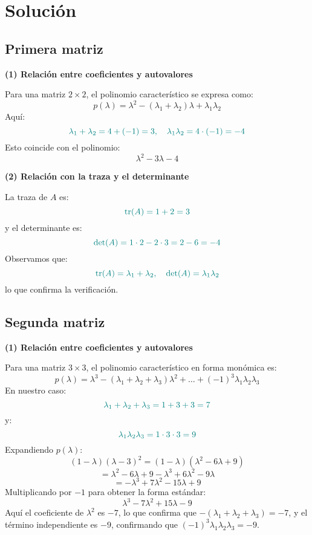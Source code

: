 \documentclass{article}
\begin{document}
\newpage
\section*{Solución}

\subsection*{Primera matriz}

\textbf{(1) Relación entre coeficientes y autovalores}

Para una matriz \(2\times2\), el polinomio característico se expresa como:
\[
p(\lambda) = \lambda^2 - (\lambda_1+\lambda_2)\lambda + \lambda_1\lambda_2
\]
Aquí:
\[
\color{teal}
\lambda_1 + \lambda_2 = 4 + (-1) = 3,
\quad
\lambda_1 \lambda_2 = 4\cdot(-1) = -4
\]
Esto coincide con el polinomio:
\[
\lambda^2 - 3\lambda - 4
\]

\bigskip

\textbf{(2) Relación con la traza y el determinante}

La traza de \(A\) es:
\[
\color{teal}
\text{tr}(A) = 1 + 2 = 3
\]
y el determinante es:
\[
\color{teal}
\det(A) = 1\cdot2 - 2\cdot3 = 2 - 6 = -4
\]
Observamos que:
\[
\color{teal}
\text{tr}(A) = \lambda_1 + \lambda_2,
\quad
\det(A) = \lambda_1 \lambda_2
\]
lo que confirma la verificación.

\subsection*{Segunda matriz}

\textbf{(1) Relación entre coeficientes y autovalores}

Para una matriz \(3\times3\), el polinomio característico en forma monómica es:
\[
p(\lambda) = \lambda^3 - (\lambda_1+\lambda_2+\lambda_3)\lambda^2 + \dots + (-1)^3\lambda_1\lambda_2\lambda_3
\]
En nuestro caso:
\[
\color{teal}
\lambda_1 + \lambda_2 + \lambda_3 = 1 + 3 + 3 = 7
\]
y:
\[
\color{teal}
\lambda_1 \lambda_2 \lambda_3 = 1\cdot3\cdot3 = 9
\]
Expandiendo \(p(\lambda)\):
\[
(1-\lambda)(\lambda-3)^2 = (1-\lambda)(\lambda^2-6\lambda+9)
\]
\[
= \lambda^2-6\lambda+9 - \lambda^3+6\lambda^2-9\lambda
\]
\[
= -\lambda^3+7\lambda^2-15\lambda+9
\]
Multiplicando por \(-1\) para obtener la forma estándar:
\[
\lambda^3 - 7\lambda^2 + 15\lambda - 9
\]
Aquí el coeficiente de \(\lambda^2\) es \(-7\), lo que confirma que \(-(\lambda_1+\lambda_2+\lambda_3) = -7\), y el término independiente es \(-9\), confirmando que \((-1)^3\lambda_1\lambda_2\lambda_3 = -9\).
\end{document}
